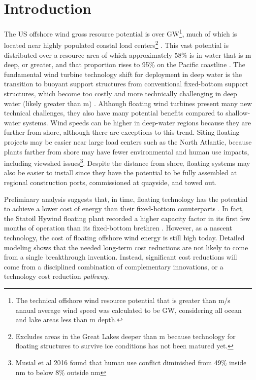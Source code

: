 \section{Introduction}
\label{sec:intro}

The US offshore wind gross resource potential is over
\unit[2000]{GW}\footnote{The technical offshore wind resource potential
  that is greater than \unit[7]{m/s} annual average wind speed was
  calculated to be \unit[2058]{GW}, considering all ocean and lake areas
  less than \unit[1000]{m} depth.}, much of which is located near highly
populated coastal load centers\footnote{Excludes areas in the Great
  Lakes deeper than \unit[60]{m} because technology for floating
  structures to survive ice conditions has not been matured yet.}
\cite{resource}.  This vast potential is distributed over a resource
area of which approximately 58\% is in water that is \unit[60]{m} deep,
or greater, and that proportion rises to 95\% on the Pacific coastline
\cite{musial-ca}. The fundamental wind turbine technology shift for
deployment in deep water is the transition to buoyant support structures
from conventional fixed-bottom support structures, which become too
costly and more technically challenging in deep water (likely greater
than \unit[50]{m}) \cite{obos}. Although floating wind turbines present
many new technical challenges, they also have many potential benefits
compared to shallow-water systems.  Wind speeds can be higher in
deep-water regions because they are further from shore, although there
are exceptions to this trend.  Siting floating projects may be easier
near large load centers such as the North Atlantic, because plants
farther from shore may have fewer environmental and human use impacts,
including viewshed issues\footnote{Musial et al 2016 found that human
  use conflict diminished from 49\% inside \unit[3]{nm} to below 8\%
  outside \unit[50]{nm}}.  Despite the distance from shore, floating
systems may also be easier to install since they have the potential to
be fully assembled at regional construction ports, commissioned at
quayside, and towed out.

Preliminary analysis suggests that, in time, floating technology has the
potential to achieve a lower cost of energy than their fixed-bottom
counterparts \cite{spatial}.  In fact, the Statoil Hywind floating plant
recorded a higher capacity factor in its first few months of operation
than its fixed-bottom brethren \cite{statoil-hywind}.  However, as a
nascent technology, the cost of floating offshore wind energy is still
high today.  Detailed modeling shows that the needed long-term cost
reductions are not likely to come from a single breakthrough
invention.  Instead, significant cost reductions will come from a
disciplined combination of complementary innovations, or a technology
cost reduction \textit{pathway}.

